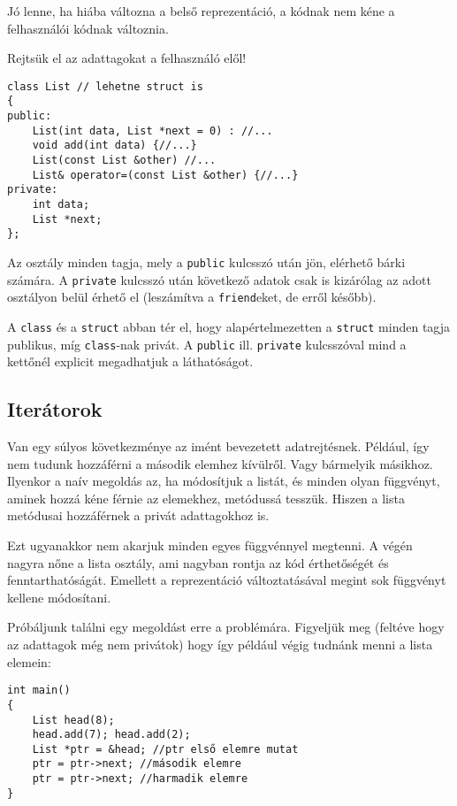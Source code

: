 \documentclass[../cpp_book/cpp_book.tex]{subfiles}
\begin{document}
	Jó lenne, ha hiába változna a belső reprezentáció, a kódnak nem kéne a felhasználói kódnak változnia. 
	
	Rejtsük el az adattagokat a felhasználó elől!

\begin{lstlisting}
class List // lehetne struct is
{
public:
	List(int data, List *next = 0) : //...
	void add(int data) {//...}
	List(const List &other) //...
	List& operator=(const List &other) {//...}
private:
	int data;
	List *next;
};
\end{lstlisting}
  Az osztály minden tagja, mely a \texttt{public} kulcsszó után jön, elérhető bárki számára. A \texttt{private} kulcsszó után következő adatok csak is kizárólag az adott osztályon belül érhető el (leszámítva a \texttt{friend}eket, de erről később).

	A \texttt{class} és a \texttt{struct} abban tér el, hogy alapértelmezetten a \texttt{struct} minden tagja publikus, míg \texttt{class}-nak privát. A \texttt{public} ill. \texttt{private} kulcsszóval mind a kettőnél explicit megadhatjuk a láthatóságot.
	\subsection{Iterátorok}
	Van egy súlyos következménye az imént bevezetett adatrejtésnek. Például, így nem tudunk hozzáférni a második elemhez kívülről. Vagy bármelyik másikhoz. Ilyenkor a naív megoldás az, ha módosítjuk a listát, és minden olyan függvényt, aminek hozzá kéne férnie az elemekhez, metódussá tesszük. Hiszen a lista metódusai hozzáférnek a privát adattagokhoz is.
	
	Ezt ugyanakkor nem akarjuk minden egyes függvénnyel megtenni. A végén nagyra nőne a lista osztály, ami nagyban rontja az kód érthetőségét és fenntarthatóságát. Emellett a reprezentáció változtatásával megint sok függvényt kellene módosítani.
	
	\medskip
	Próbáljunk találni egy megoldást erre a problémára. Figyeljük meg (feltéve hogy az adattagok még nem privátok) hogy így például végig tudnánk menni a lista elemein:
	\begin{lstlisting}
int main()
{
	List head(8);
	head.add(7); head.add(2);
	List *ptr = &head; //ptr első elemre mutat
	ptr = ptr->next; //második elemre
	ptr = ptr->next; //harmadik elemre
}
	\end{lstlisting}
	
\end{document}
